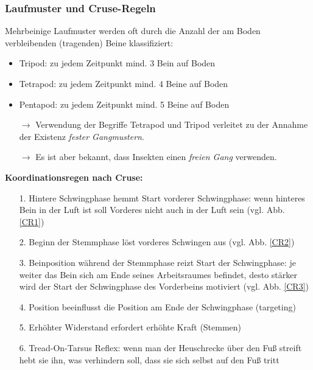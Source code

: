 \subsubsection{Laufmuster und Cruse-Regeln}
Mehrbeinige Laufmuster werden oft durch die Anzahl der
am Boden verbleibenden (tragenden) Beine klassifiziert:
\begin{itemize}
\item Tripod: zu jedem Zeitpunkt mind. 3 Bein auf Boden
\item Tetrapod: zu jedem Zeitpunkt mind. 4 Beine auf Boden
\item Pentapod: zu jedem Zeitpunkt mind. 5 Beine auf Boden
\item[$\rightarrow$] Verwendung der Begriffe Tetrapod und Tripod
verleitet zu der Annahme der Existenz \textit{fester Gangmustern}.
\item[$\rightarrow$] Es ist aber bekannt, dass Insekten einen \textit{freien
Gang} verwenden.
\end{itemize}
\textbf{Koordinationsregen nach Cruse:}
\begin{itemize}
\item[1.] Hintere Schwingphase hemmt Start vorderer Schwingphase: wenn hinteres Bein in der Luft ist soll Vorderes nicht auch in der Luft sein (vgl. Abb. \ref{CR1})
\item[2.] Beginn der Stemmphase löst vorderes Schwingen aus (vgl. Abb. \ref{CR2})
\item[3.] Beinposition während der Stemmphase reizt Start der Schwingphase: je weiter das Bein sich am Ende seines Arbeitsraumes befindet, desto stärker wird der Start der Schwingphase des Vorderbeins motiviert (vgl. Abb. \ref{CR3})
\item[4.] Position beeinflusst die Position am Ende der Schwingphase (\glqq targeting\grqq)
\item[5.] Erhöhter Widerstand erfordert erhöhte Kraft (Stemmen)
\item[6.] Tread-On-Tarsus Reflex: wenn man der Heuschrecke über den Fuß streift hebt sie ihn, was verhindern soll, dass sie sich selbst auf den Fuß tritt
\end{itemize}
